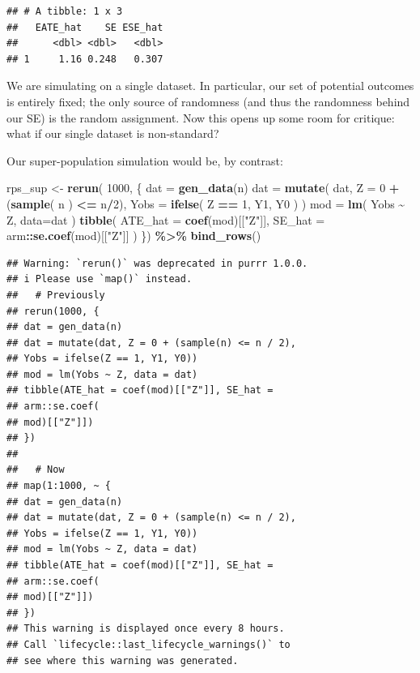 \documentclass[
]{book}
\newenvironment{Shaded}{\begin{snugshade}}{\end{snugshade}}
\newcommand{\AttributeTok}[1]{\textcolor[rgb]{0.13,0.29,0.53}{#1}}
\newcommand{\DecValTok}[1]{\textcolor[rgb]{0.00,0.00,0.81}{#1}}
\newcommand{\FunctionTok}[1]{\textcolor[rgb]{0.13,0.29,0.53}{\textbf{#1}}}
\newcommand{\NormalTok}[1]{#1}
\newcommand{\OtherTok}[1]{\textcolor[rgb]{0.56,0.35,0.01}{#1}}
\newcommand{\SpecialCharTok}[1]{\textcolor[rgb]{0.81,0.36,0.00}{\textbf{#1}}}
\newcommand{\StringTok}[1]{\textcolor[rgb]{0.31,0.60,0.02}{#1}}
\begin{document}
\begin{verbatim}
## # A tibble: 1 x 3
##   EATE_hat    SE ESE_hat
##      <dbl> <dbl>   <dbl>
## 1     1.16 0.248   0.307
\end{verbatim}

We are simulating on a single dataset.
In particular, our set of potential outcomes is entirely fixed; the only source of randomness (and thus the randomness behind our SE) is the random assignment.
Now this opens up some room for critique: what if our single dataset is non-standard?

Our super-population simulation would be, by contrast:

\begin{Shaded}
\begin{Highlighting}[]
\NormalTok{rps\_sup }\OtherTok{\textless{}{-}} \FunctionTok{rerun}\NormalTok{( }\DecValTok{1000}\NormalTok{, \{}
\NormalTok{  dat }\OtherTok{=} \FunctionTok{gen\_data}\NormalTok{(n)}
\NormalTok{  dat }\OtherTok{=} \FunctionTok{mutate}\NormalTok{( dat,}
              \AttributeTok{Z =} \DecValTok{0} \SpecialCharTok{+}\NormalTok{ (}\FunctionTok{sample}\NormalTok{( n ) }\SpecialCharTok{\textless{}=}\NormalTok{ n}\SpecialCharTok{/}\DecValTok{2}\NormalTok{),}
              \AttributeTok{Yobs =} \FunctionTok{ifelse}\NormalTok{( Z }\SpecialCharTok{==} \DecValTok{1}\NormalTok{, Y1, Y0 ) )}
\NormalTok{  mod }\OtherTok{=} \FunctionTok{lm}\NormalTok{( Yobs }\SpecialCharTok{\textasciitilde{}}\NormalTok{ Z, }\AttributeTok{data=}\NormalTok{dat )}
  \FunctionTok{tibble}\NormalTok{( }\AttributeTok{ATE\_hat =} \FunctionTok{coef}\NormalTok{(mod)[[}\StringTok{"Z"}\NormalTok{]],}
          \AttributeTok{SE\_hat =}\NormalTok{ arm}\SpecialCharTok{::}\FunctionTok{se.coef}\NormalTok{(mod)[[}\StringTok{"Z"}\NormalTok{]] )}
\NormalTok{  \}) }\SpecialCharTok{\%\textgreater{}\%}
  \FunctionTok{bind\_rows}\NormalTok{()}
\end{Highlighting}
\end{Shaded}

\begin{verbatim}
## Warning: `rerun()` was deprecated in purrr 1.0.0.
## i Please use `map()` instead.
##   # Previously
## rerun(1000, {
## dat = gen_data(n)
## dat = mutate(dat, Z = 0 + (sample(n) <= n / 2),
## Yobs = ifelse(Z == 1, Y1, Y0))
## mod = lm(Yobs ~ Z, data = dat)
## tibble(ATE_hat = coef(mod)[["Z"]], SE_hat =
## arm::se.coef(
## mod)[["Z"]])
## })
## 
##   # Now
## map(1:1000, ~ {
## dat = gen_data(n)
## dat = mutate(dat, Z = 0 + (sample(n) <= n / 2),
## Yobs = ifelse(Z == 1, Y1, Y0))
## mod = lm(Yobs ~ Z, data = dat)
## tibble(ATE_hat = coef(mod)[["Z"]], SE_hat =
## arm::se.coef(
## mod)[["Z"]])
## })
## This warning is displayed once every 8 hours.
## Call `lifecycle::last_lifecycle_warnings()` to
## see where this warning was generated.
\end{verbatim}
\end{document}
